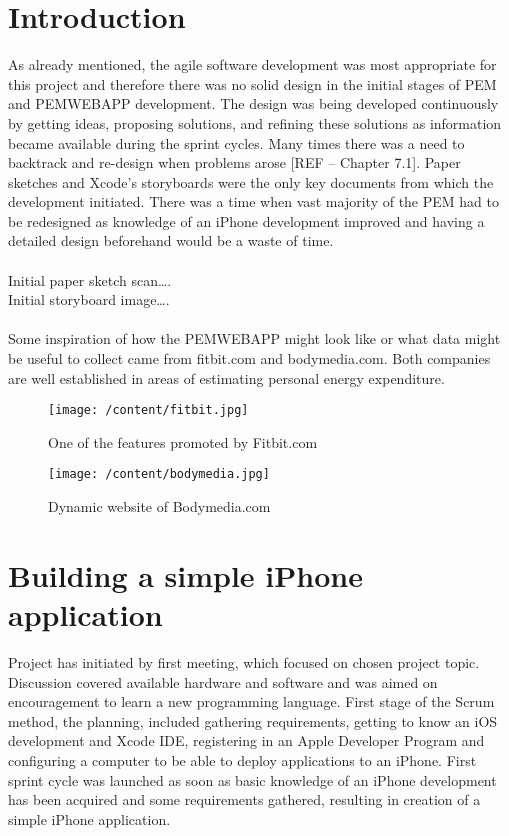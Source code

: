 \documentclass[12pt, a4paper]{report}   %
\begin{document}
\begin{enumerate}
\section{Introduction}
As already mentioned, the agile software development was most appropriate for this project and therefore there was no solid design in the initial stages of PEM and PEMWEBAPP development.
The design was being developed continuously by getting ideas, proposing solutions, and refining these solutions as information became available during the sprint cycles. Many times there was a need to backtrack and re-design when problems arose [REF – Chapter 7.1]. Paper sketches and Xcode's storyboards were the only key documents from which the development initiated. There was a time when vast majority of the PEM had to be redesigned as knowledge of an iPhone development improved and having a detailed design beforehand would be a waste of time.\\ \\
Initial paper sketch scan….\\
Initial storyboard image….\\ \\
Some inspiration of how the PEMWEBAPP might look like or what data might be useful to collect came from fitbit.com and bodymedia.com. Both companies are well established in areas of estimating personal energy expenditure.

\begin{figure}[H]
  \centering
	\texttt{[image: /content/fitbit.jpg]}
	  \caption{One of the features promoted by Fitbit.com}
\end{figure}

\begin{figure}[H]
  \centering
	\texttt{[image: /content/bodymedia.jpg]}
	  \caption{Dynamic website of Bodymedia.com}
\end{figure}

\clearpage
\section{Building a simple iPhone application}
Project has initiated by first meeting, which focused on chosen project topic. Discussion covered available hardware and software and was aimed on encouragement to learn a new programming language. First stage of the Scrum method, the planning, included gathering requirements, getting to know an iOS development and Xcode IDE, registering in an Apple Developer Program and configuring a computer to be able to deploy applications to an iPhone. First sprint cycle was launched as soon as basic knowledge of an iPhone development has been acquired and some requirements gathered, resulting in creation of a simple iPhone application.


\end{enumerate}
\end{document}
